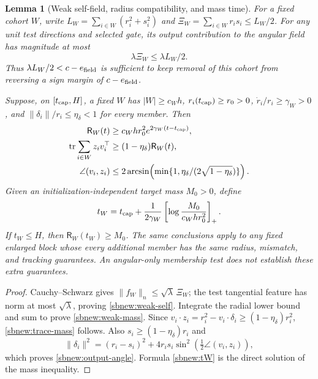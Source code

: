 \documentclass{article} %
\theoremstyle{plain}
\newtheorem{lemma}[theorem]{Lemma}
\theoremstyle{definition}
\theoremstyle{remark}
\begin{document}
\begin{lemma}[Weak self-field, radius compatibility, and mass time]
\label{sbnew:mass}
For a fixed cohort $W$, write
$L_W=\sum_{i\in W}(r_i^2+s_i^2)$ and
$\Xi_W=\sum_{i\in W}r_is_i\le L_W/2$.
For any unit test directions and selected gate, its output contribution
to the angular field has magnitude at most
\begin{equation}\label{sbnew:weak-self}
 \lambda\Xi_W\le\lambda L_W/2.
\end{equation}
Thus $\lambda L_W/2<c-e_{\rm field}$ is sufficient to keep removal of
this cohort from reversing a sign margin of $c-e_{\rm field}$.

Suppose, on $[t_{\rm cap},H]$, a fixed $W$ has $|W|\ge c_Wh$,
$r_i(t_{\rm cap})\ge r_0>0$, $\dot r_i/r_i\ge\gamma_W>0$,
and $\|\delta_i\|/r_i\le\eta_\delta<1$ for every member.
Then
\begin{align}
 \mathsf R_W(t)&\ge c_Wh r_0^2e^{2\gamma_W(t-t_{\rm cap})},
 \label{sbnew:weak-mass}\\
 \operatorname{tr}\sum_{i\in W}z_iv_i^\top
 &\ge(1-\eta_\delta)\mathsf R_W(t),\label{sbnew:trace-mass}\\
 \angle(v_i,z_i)&\le
 2\arcsin\!\left(\min\{1,\eta_\delta/(2\sqrt{1-\eta_\delta})\}\right).
 \label{sbnew:output-angle}
\end{align}
Given an initialization-independent target mass $M_0>0$, define
\begin{equation}\label{sbnew:tW}
 t_W=t_{\rm cap}+
 \frac1{2\gamma_W}\left[\log\frac{M_0}{c_Wh r_0^2}\right]_+.
\end{equation}
If $t_W\le H$, then $\mathsf R_W(t_W)\ge M_0$.
The same conclusions apply to any fixed enlarged block whose every
additional member has the same radius, mismatch, and tracking guarantees.
An angular-only membership test does not establish these extra guarantees.
\end{lemma}
\begin{proof}
Cauchy--Schwarz gives $\|f_W\|_n\le\sqrt\lambda\,\Xi_W$;
the test tangential feature has norm at most $\sqrt\lambda$, proving
\eqref{sbnew:weak-self}. Integrate the radial lower bound and sum to prove
\eqref{sbnew:weak-mass}. Since
$v_i\cdot z_i=r_i^2-v_i\cdot\delta_i\ge(1-\eta_\delta)r_i^2$,
\eqref{sbnew:trace-mass} follows. Also $s_i\ge(1-\eta_\delta)r_i$ and
\[
 \|\delta_i\|^2=(r_i-s_i)^2+
 4r_is_i\sin^2\!\left(\tfrac12\angle(v_i,z_i)\right),
\]
which proves \eqref{sbnew:output-angle}. Formula \eqref{sbnew:tW} is the
direct solution of the mass inequality.
\end{proof}
\end{document}
